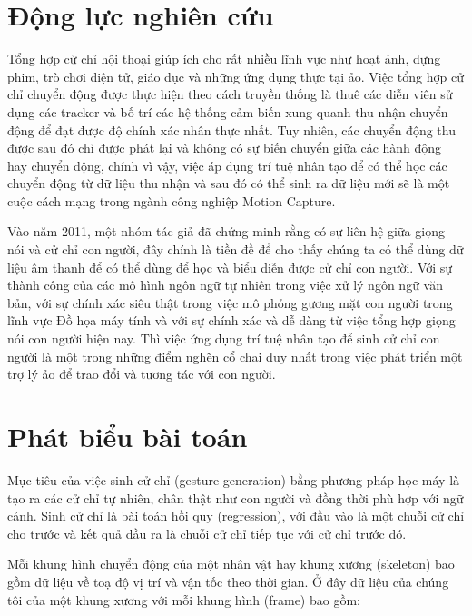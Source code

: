 \section{Động lực nghiên cứu}

Tổng hợp cử chỉ hội thoại giúp ích cho rất nhiều lĩnh vực như hoạt ảnh, dựng phim, trò chơi điện tử, giáo dục và những ứng dụng thực tại ảo. Việc tổng hợp cử chỉ chuyển động được thực hiện theo cách truyền thống là thuê các diễn viên sử dụng các tracker và bố trí các hệ thống cảm biến xung quanh thu nhận chuyển động để đạt được độ chính xác nhân thực nhất. Tuy nhiên, các chuyển động thu được sau đó chỉ được phát lại và không có sự biến chuyển giữa các hành động hay chuyển động, chính vì vậy, việc áp dụng trí tuệ nhân tạo để có thể học các chuyển động từ dữ liệu thu nhận và sau đó có thể sinh ra dữ liệu mới sẽ là một cuộc cách mạng trong ngành công nghiệp Motion Capture.

Vào năm 2011, một nhóm tác giả \cite{bergmann2011relation} đã chứng minh rằng có sự liên hệ giữa giọng nói và cử chỉ con người, đây chính là tiền đề để cho thấy chúng ta có thể dùng dữ liệu âm thanh để có thể dùng để học và biểu diễn được cử chỉ con người.
Với sự thành công của các mô hình ngôn ngữ tự nhiên trong việc xử lý ngôn ngữ văn bản, với sự chính xác siêu thật trong việc mô phỏng gương mặt con người trong lĩnh vực Đồ họa máy tính và với sự chính xác và dễ dàng từ việc tổng hợp giọng nói con người hiện nay. Thì việc ứng dụng trí tuệ nhân tạo để sinh cử chỉ con người là một trong những điểm nghẽn cổ chai duy nhất trong việc phát triển một trợ lý ảo để trao đổi và tương tác với con người.

\section{Phát biểu bài toán}

Mục tiêu của việc sinh cử chỉ (gesture generation) bằng phương pháp học máy là tạo ra các cử chỉ tự nhiên, chân thật như con người và đồng thời phù hợp với ngữ cảnh.
Sinh cử chỉ là bài toán hồi quy (regression), với đầu vào là một chuỗi cử chỉ cho trước và kết quả đầu ra là chuỗi cử chỉ tiếp tục với cử chỉ trước đó.

Mỗi khung hình chuyển động của một nhân vật hay khung xương (skeleton) bao gồm dữ liệu về toạ độ vị trí và vận tốc theo thời gian.
Ở đây dữ liệu của chúng tôi của một khung xương với mỗi khung hình (frame) bao gồm:

